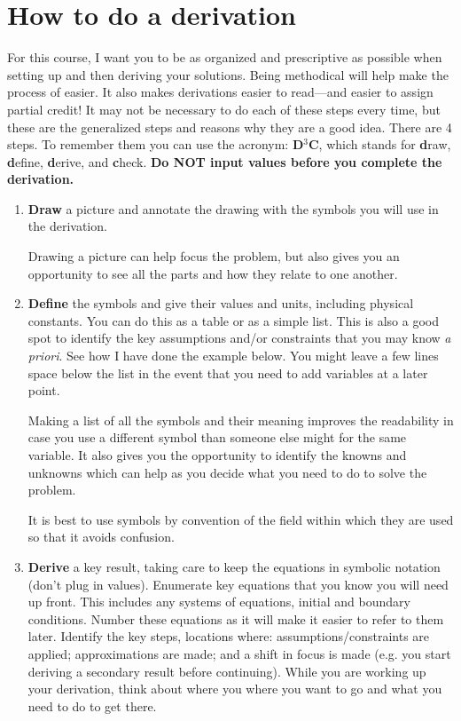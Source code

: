 \documentclass[final,a4paper,12pt]{article}
\begin{document}
\section{How to do a derivation}
For this course, I want you to be as organized and prescriptive as possible when
setting up and then deriving your solutions.  Being methodical will help make
the process of easier.  It also makes derivations easier to read---and easier to
assign partial credit!  It may not be necessary to do each of these steps every
time, but these are the generalized steps and reasons why they are a good idea.
There are 4 steps.  To remember them you can use the acronym: {\bf D$^{3}$C},
which stands for {\bf d}raw, {\bf d}efine, {\bf d}erive, and {\bf c}heck.  {\bf
Do NOT input values before you complete the derivation.}
\begin{enumerate}
    \item {\bf Draw} a picture and annotate the drawing with the symbols you
    will use in the derivation.

    Drawing a picture can help focus the problem, but also gives you an
    opportunity to see all the parts and how they relate to one another.

    \item {\bf Define} the symbols and give their values and units, including
    physical constants.  You can do this as a table or as a simple list.  This
    is also a good spot to identify the key assumptions and/or constraints that
    you may know {\it a priori}.  See how I have done the example below.  You
    might leave a few lines space below the list in the event that you need to
    add variables at a later point.

    Making a list of all the symbols and their meaning improves the readability
    in case you use a different symbol than someone else might for the same
    variable.  It also gives you the opportunity to identify the knowns and
    unknowns which can help as you decide what you need to do to solve the
    problem.
    
    It is best to use symbols by convention of the field within which
    they are used so that it avoids confusion.

    \item {\bf Derive} a key result, taking care to keep the equations in
    symbolic notation (don't plug in values).  Enumerate key equations that you
    know you will need up front.  This includes any systems of equations,
    initial and boundary conditions.  Number these equations as it will make it
    easier to refer to them later.  Identify the key steps, locations where:
    assumptions/constraints are applied; approximations are made; and a shift in
    focus is made (e.g. you start deriving a secondary result before
    continuing).  While you are working up your derivation, think about where
    you where you want to go and what you need to do to get there.


\end{enumerate}
\end{document}
